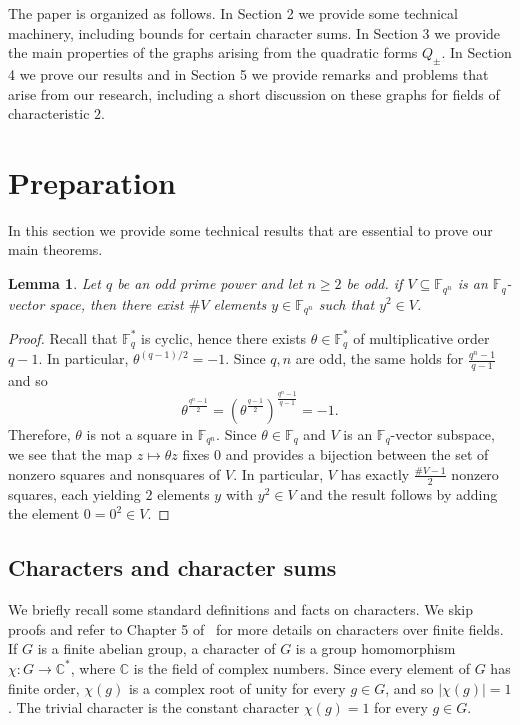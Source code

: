 \documentclass[11pt]{amsart}
\newcommand{\F}{\mathbb F}
\newcommand{\C}{\mathbb C}
\newtheorem{lemma}[theorem]{Lemma}
\theoremstyle{definition}
\theoremstyle{remark}
\begin{document}
The paper is organized as follows. In Section 2 we provide some technical machinery, including bounds for certain character sums. In Section 3 we provide the main properties of the graphs arising from the quadratic forms $Q_{\pm}$. In Section 4 we prove our results and in Section 5 we provide remarks and problems that arise from our research, including a short discussion on these graphs for fields of characteristic $2$.

\section{Preparation}
In this section we provide some technical results that are essential to prove our main theorems. 


\begin{lemma}\label{lem:square}
Let $q$ be an odd prime power and let $n\ge 2$ be odd. if $V\subseteq \F_{q^n}$ is an $\F_q$-vector space, then there exist $\# V$ elements $y\in \F_{q^n}$ such that $y^2\in V$. 
\end{lemma}
\begin{proof}
Recall that $\F_q^*$ is cyclic, hence there exists $\theta\in \F_q^*$ of multiplicative order $q-1$. In particular, $\theta^{(q-1)/2}=-1$. Since $q, n$ are odd, the same holds for $\frac{q^n-1}{q-1}$ and so 
$$\theta^{\frac{q^n-1}{2}}=(\theta^\frac{q-1}{2})^{\frac{q^n-1}{q-1}}=-1.$$
Therefore, $\theta$ is not a square in $\F_{q^n}$. Since $\theta\in \F_q$ and $V$ is an $\F_q$-vector subspace, we see that the map $z\mapsto \theta z$ fixes $0$ and provides a bijection between the set of nonzero squares and nonsquares of $V$. In particular, $V$ has exactly $\frac{\#V-1}{2}$ nonzero squares, each yielding $2$ elements $y$ with $y^2\in V$ and the result follows by adding the element $0=0^2\in V$. 
\end{proof}






\subsection{Characters and character sums}
We briefly recall some standard definitions and facts on characters. We skip proofs and  refer to Chapter 5 of~\cite{LN} for more details on characters over finite fields. If $G$ is a finite abelian group, a character of $G$ is a group homomorphism $\chi:G\to \C^*$, where $\C$ is the field of complex numbers. Since every element of $G$ has finite order, $\chi(g)$ is a complex root of unity for every $g\in G$, and so $|\chi(g)|=1$. The trivial character is the constant character $\chi(g)=1$ for every $g\in G$.
\end{document}
